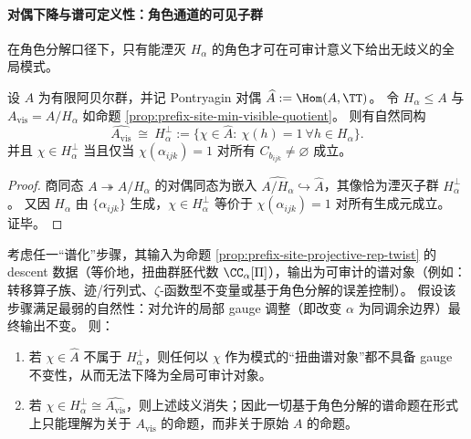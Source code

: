\paragraph{对偶下降与谱可定义性：角色通道的可见子群}
在角色分解口径下，只有能湮灭 \(H_\alpha\) 的角色才可在可审计意义下给出无歧义的全局模式。

\begin{corollary}[可见角色与湮灭子群]\label{cor:prefix-site-visible-characters-annihilator}
设 \(A\) 为有限阿贝尔群，并记 Pontryagin 对偶 \(\widehat A:=\Hom(A,\TT)\)。
令 \(H_\alpha\le A\) 与 \(A_{\mathrm{vis}}=A/H_\alpha\) 如命题 \ref{prop:prefix-site-min-visible-quotient}。
则有自然同构
\[
\widehat{A_{\mathrm{vis}}}\ \cong\ H_\alpha^\perp
:=\{\chi\in\widehat A:\ \chi(h)=1\ \forall h\in H_\alpha\}.
\]
并且 \(\chi\in H_\alpha^\perp\) 当且仅当 \(\chi(\alpha_{ijk})=1\) 对所有 \(C_{b_{ijk}}\neq\varnothing\) 成立。
\end{corollary}

\begin{proof}
商同态 \(A\twoheadrightarrow A/H_\alpha\) 的对偶同态为嵌入 \(\widehat{A/H_\alpha}\hookrightarrow \widehat A\)，其像恰为湮灭子群 \(H_\alpha^\perp\)。
又因 \(H_\alpha\) 由 \(\{\alpha_{ijk}\}\) 生成，\(\chi\in H_\alpha^\perp\) 等价于 \(\chi(\alpha_{ijk})=1\) 对所有生成元成立。
证毕。
\end{proof}

\begin{theorem}\label{thm:prefix-site-spectral-definability-avis}
考虑任一“谱化”步骤，其输入为命题 \ref{prop:prefix-site-projective-rep-twist} 的 descent 数据（等价地，扭曲群胚代数 \(\CC_\alpha[\Pi]\)），输出为可审计的谱对象（例如：转移算子族、迹/行列式、\(\zeta\)-函数型不变量或基于角色分解的误差控制）。
假设该步骤满足最弱的自然性：对允许的局部 gauge 调整（即改变 \(\alpha\) 为同调余边界）最终输出不变。
则：
\begin{enumerate}
  \item 若 \(\chi\in\widehat A\) 不属于 \(H_\alpha^\perp\)，则任何以 \(\chi\) 作为模式的“扭曲谱对象”都不具备 gauge 不变性，从而无法下降为全局可审计对象。
  \item 若 \(\chi\in H_\alpha^\perp\cong\widehat{A_{\mathrm{vis}}}\)，则上述歧义消失；因此一切基于角色分解的谱命题在形式上只能理解为关于 \(A_{\mathrm{vis}}\) 的命题，而非关于原始 \(A\) 的命题。
\end{enumerate}
\end{theorem}

